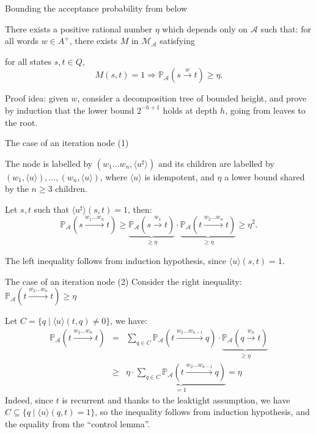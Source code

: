 \documentclass[svgnames]{beamer}
\renewcommand{\AA}{\mathcal{A}}
\newcommand{\MM}{\mathcal{M}}
\newcommand{\MMAA}{\MM_\AA}
\newcommand{\tr}[1]{\langle #1 \rangle}
\newcommand{\prob}[1]{\mathbb{P}_{#1}}
\newcommand{\set}[1]{\{ #1 \}}
\begin{document}
\begin{frame}{Bounding the acceptance probability from below}

\begin{lemma}
There exists a positive rational number $\eta$ which depends only on $\AA$ such that:
for all words $w \in A^+$, there exists $M$ in $\MMAA$
satisfying

for all states $s,t \in Q$,
$$M(s,t) = 1 \Rightarrow \prob{\AA}(s \xrightarrow{w} t) \geq \eta.$$
\end{lemma}

\pause
Proof idea: given $w$, consider a decomposition tree of bounded height,
and prove by induction that the lower bound $2^{-h+1}$ holds at depth $h$,
going from leaves to the root.
\end{frame}

\begin{frame}{The case of an iteration node (1)}

The node is labelled by $(w_1 \ldots w_n,\tr{u^\sharp})$
and its children are labelled by $(w_1,\tr{u}),\ldots,(w_n,\tr{u})$,
where $\tr{u}$ is idempotent, and $\eta$ a lower bound shared by the $n \geq 3$ children.

\pause
Let $s,t$ such that $\tr{u^\sharp}(s,t) = 1$, then:
$$\prob{\AA}(s \xrightarrow{w_1 \ldots w_n} t)
\geq \underbrace{\prob{\AA}(s \xrightarrow{w_1} t)}_{\geq \eta} 
\cdot \underbrace{\prob{\AA}(t \xrightarrow{w_2 \ldots w_n} t)}_{\geq \eta}
\geq \eta^2.$$

\pause
The left inequality follows from induction hypothesis,
since $\tr{u}(s,t) = 1$.
\end{frame}

\begin{frame}{The case of an iteration node (2)}
Consider the right inequality: $\prob{\AA}(t \xrightarrow{w_2 \ldots w_n} t) \geq \eta$

Let $C = \set{q \mid \tr{u}(t,q) \neq 0}$, we have:
$$\begin{array}{lll}
\prob{\AA}(t \xrightarrow{w_2 \ldots w_n} t) 
& = & \sum_{q \in C} \prob{\AA}(t \xrightarrow{w_2 \ldots w_{n-1}} q) 
\cdot \underbrace{\prob{\AA}(q \xrightarrow{w_n} t)}_{\geq \eta} \\
& \geq & \eta \cdot 
\underbrace{\sum_{q \in C} \prob{\AA}(t \xrightarrow{w_2 \ldots w_{n-1}} q)}_{= 1} = \eta
\end{array}$$
Indeed, since $t$ is recurrent and thanks to the leaktight assumption,
we have $C \subseteq \set{q \mid \tr{u}(q,t) = 1}$,
so the inequality follows from induction hypothesis,
and the equality from the ``control lemma''.
\end{frame}
\end{document}
